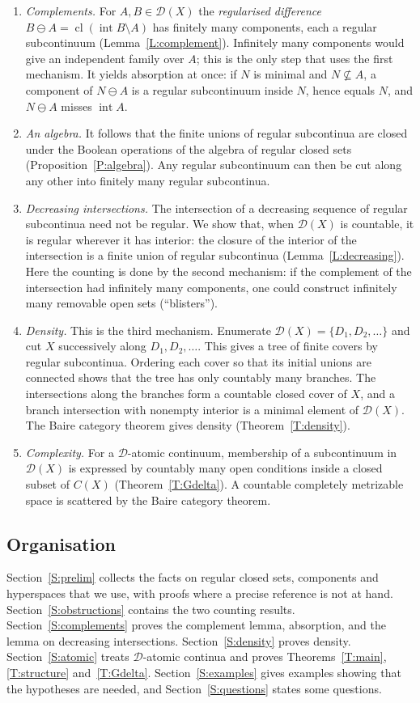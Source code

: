 \documentclass[11pt,reqno]{amsart}
\theoremstyle{plain}
\theoremstyle{definition}
\theoremstyle{remark}
\newcommand{\D}{\mathcal{D}}
\newcommand{\cl}{\operatorname{cl}}
\newcommand{\intr}{\operatorname{int}}
\newcommand{\rd}{\ominus}
\begin{document}
\begin{enumerate}[label=\textup{(\roman*)}]
\item \emph{Complements.} For $A,B\in\D(X)$ the \emph{regularised difference} $B\rd A=\cl(\intr B\setminus A)$ has finitely many components, each a regular subcontinuum (Lemma~\ref{L:complement}). Infinitely many components would give an independent family over $A$; this is the only step that uses the first mechanism. It yields absorption at once: if $N$ is minimal and $N\not\subseteq A$, a component of $N\rd A$ is a regular subcontinuum inside $N$, hence equals $N$, and $N\rd A$ misses $\intr A$.
\item \emph{An algebra.} It follows that the finite unions of regular subcontinua are closed under the Boolean operations of the algebra of regular closed sets (Proposition~\ref{P:algebra}). Any regular subcontinuum can then be cut along any other into finitely many regular subcontinua.
\item \emph{Decreasing intersections.} The intersection of a decreasing sequence of regular subcontinua need not be regular. We show that, when $\D(X)$ is countable, it is regular wherever it has interior: the closure of the interior of the intersection is a finite union of regular subcontinua (Lemma~\ref{L:decreasing}). Here the counting is done by the second mechanism: if the complement of the intersection had infinitely many components, one could construct infinitely many removable open sets (``blisters'').
\item \emph{Density.} This is the third mechanism. Enumerate $\D(X)=\{D_1,D_2,\dots\}$ and cut $X$ successively along $D_1,D_2,\dots$. This gives a tree of finite covers by regular subcontinua. Ordering each cover so that its initial unions are connected shows that the tree has only countably many branches. The intersections along the branches form a countable closed cover of $X$, and a branch intersection with nonempty interior is a minimal element of $\D(X)$. The Baire category theorem gives density (Theorem~\ref{T:density}).
\item \emph{Complexity.} For a $\D$-atomic continuum, membership of a subcontinuum in $\D(X)$ is expressed by countably many open conditions inside a closed subset of $C(X)$ (Theorem~\ref{T:Gdelta}). A countable completely metrizable space is scattered by the Baire category theorem.
\end{enumerate}

\subsection{Organisation}
Section~\ref{S:prelim} collects the facts on regular closed sets, components and hyperspaces that we use, with proofs where a precise reference is not at hand. Section~\ref{S:obstructions} contains the two counting results. Section~\ref{S:complements} proves the complement lemma, absorption, and the lemma on decreasing intersections. Section~\ref{S:density} proves density. Section~\ref{S:atomic} treats $\D$-atomic continua and proves Theorems~\ref{T:main}, \ref{T:structure} and~\ref{T:Gdelta}. Section~\ref{S:examples} gives examples showing that the hypotheses are needed, and Section~\ref{S:questions} states some questions.
\end{document}
